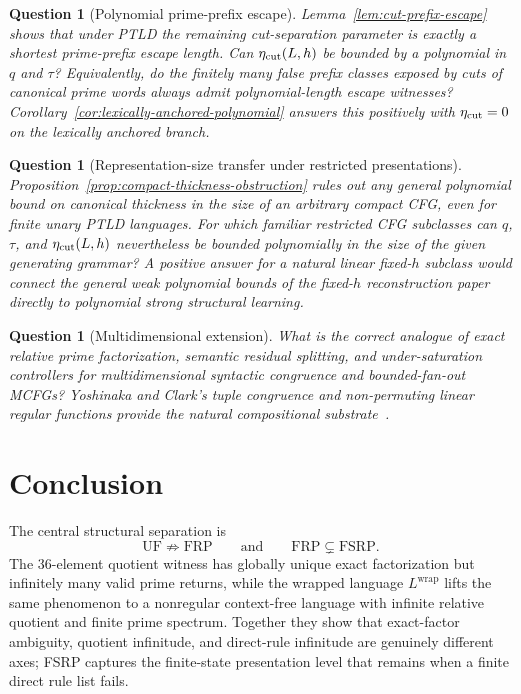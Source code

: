 \documentclass[11pt,a4paper]{article}
\newtheorem{question}[theorem]{Question}
\begin{document}
\begin{question}[Polynomial prime-prefix escape]
Lemma~\ref{lem:cut-prefix-escape} shows that under PTLD the remaining
cut-separation parameter is exactly a shortest prime-prefix escape length.
Can $\eta_{\rm cut}(L,h)$ be bounded by a polynomial in $q$ and $\tau$?
Equivalently, do the finitely many false prefix classes exposed by cuts of
canonical prime words always admit polynomial-length escape witnesses?
Corollary~\ref{cor:lexically-anchored-polynomial} answers this positively
with $\eta_{\rm cut}=0$ on the lexically anchored branch.
\end{question}

\begin{question}[Representation-size transfer under restricted presentations]
Proposition~\ref{prop:compact-thickness-obstruction} rules out any general
polynomial bound on canonical thickness in the size of an arbitrary compact
CFG, even for finite unary PTLD languages.  For which familiar restricted
CFG subclasses can $q$, $\tau$, and $\eta_{\rm cut}(L,h)$ nevertheless be
bounded polynomially in the size of the given generating grammar?  A
positive answer for a natural linear fixed-$h$ subclass would connect the
general weak polynomial bounds of the fixed-$h$ reconstruction paper
directly to polynomial strong structural learning.
\end{question}

\begin{question}[Multidimensional extension]
What is the correct analogue of exact relative prime factorization, semantic residual splitting, and under-saturation controllers for multidimensional syntactic congruence and bounded-fan-out MCFGs?  Yoshinaka and Clark's tuple congruence and non-permuting linear regular functions provide the natural compositional substrate~\cite{YoshinakaClark2012}.
\end{question}

\section{Conclusion}

The central structural separation is
\[
  \mathrm{UF}\not\Rightarrow\mathrm{FRP}
  \qquad\text{and}\qquad
  \mathrm{FRP}\subsetneq\mathrm{FSRP}.
\]
The $36$-element quotient witness has globally unique exact factorization but infinitely many valid prime returns, while the wrapped language $L^{\mathrm{wrap}}$ lifts the same phenomenon to a nonregular context-free language with infinite relative quotient and finite prime spectrum.  Together they show that exact-factor ambiguity, quotient infinitude, and direct-rule infinitude are genuinely different axes; FSRP captures the finite-state presentation level that remains when a finite direct rule list fails.
\end{document}
